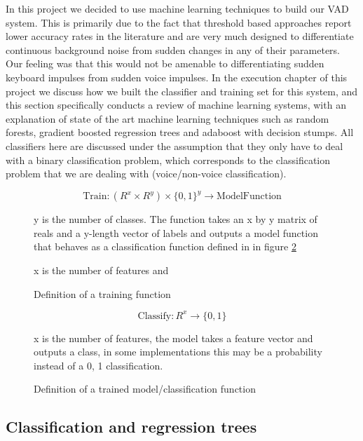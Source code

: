 \documentclass[ %
                    author={Sam Phippen},
                supervisor={Dr. Rafal Bogacz},
                     title={Real time voice activity detectors in noisy personal computing environments},
                  subtitle={},
                    degree={MEng},
                      year={2012} ]{thesis}
\begin{document}
In this project we decided to use machine learning techniques to build our VAD
system. This is primarily due to the fact that threshold based approaches
report lower accuracy rates in the literature and are very much designed to
differentiate continuous background noise from sudden changes in any of their
parameters. Our feeling was that this would not be amenable to differentiating
sudden keyboard impulses from sudden voice impulses. In the execution chapter
of this project we discuss how we built the classifier and training set for
this system, and this section specifically conducts a review of machine
learning systems, with an explanation of state of the art machine learning
techniques such as random forests, gradient boosted regression trees and
adaboost with decision stumps. All classifiers here are discussed under the
assumption that they only have to deal with a binary classification problem,
which corresponds to the classification problem that we are dealing with
(voice/non-voice classification).

\begin{figure}
    $$\text{Train}:(R^x \times R^y) \times \{0,1\}^y \rightarrow \text{ModelFunction}$$

    y is the number of classes. The function takes an x by y matrix of reals
    and a y-length vector of labels and outputs a model function that behaves
    as a classification function defined in in figure \ref{eqn:define-classify}

    \caption{Definition of a training function} x is the number of features and

    \label{eqn:define-train}
\end{figure}

\begin{figure}
    $$\text{Classify}: R^x \rightarrow \{0,1\}$$

    x is the number of features, the model takes a feature vector and outputs a
    class, in some implementations this may be a probability instead of a {0, 1}
    classification.

    \caption{Definition of a trained model/classification function}

    \label{eqn:define-classify}
\end{figure}

\subsection{Classification and regression trees}
\end{document}
